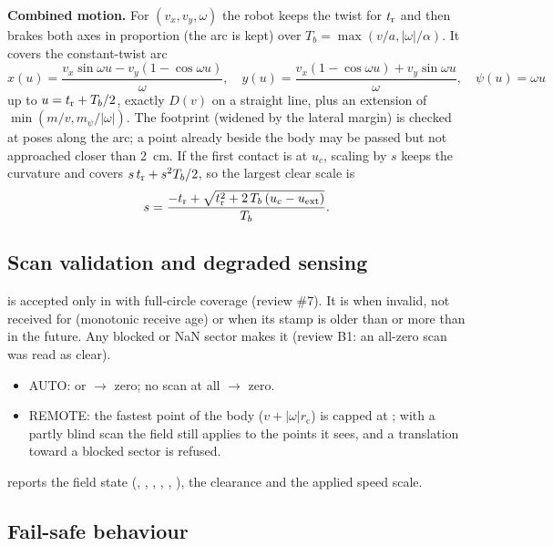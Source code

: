 \textbf{Combined motion.} For $(v_x, v_y, \omega)$ the robot keeps the twist for $t_{\mathrm{r}}$ and then
brakes both axes in proportion (the arc is kept) over $T_b = \max(v/a, |\omega|/\alpha)$. It covers
the constant-twist arc
\begin{equation}
  x(u) = \frac{v_x\sin\omega u - v_y(1 - \cos\omega u)}{\omega}, \quad
  y(u) = \frac{v_x(1 - \cos\omega u) + v_y\sin\omega u}{\omega}, \quad \psi(u) = \omega u
\end{equation}
up to $u = t_{\mathrm{r}} + T_b/2$, exactly $D(v)$ on a straight line, plus an extension of
$\min(m/v, m_\psi/|\omega|)$. The footprint (widened by the lateral margin) is checked at poses
along the arc; a point already beside the body may be passed but not approached closer than
2~cm. If the first contact is at $u_c$, scaling by $s$ keeps the curvature and covers
$s\,t_{\mathrm{r}} + s^2 T_b/2$, so the largest clear scale is
\begin{equation}
  s = \frac{-t_{\mathrm{r}} + \sqrt{t_{\mathrm{r}}^2 + 2\,T_b\,(u_c - u_{\mathrm{ext}})}}{T_b}.
\end{equation}

\subsection{Scan validation and degraded sensing}

 is accepted only in  with full-circle
coverage (review \#7). It is  when invalid, not received for
 (monotonic receive age) or when its stamp is older than
 or more than  in the future.
Any blocked or NaN sector makes it  (review B1: an all-zero scan was read as clear).
\begin{itemize}
  \item AUTO:  or  $\to$ zero; no scan at all $\to$ zero.
  \item REMOTE: the fastest point of the body ($v + |\omega| r_{\mathrm{c}}$) is capped at
    ; with a partly blind scan the field still applies to the
    points it sees, and a translation toward a blocked sector is refused.
\end{itemize}
 reports the field state (, , ,
, , ), the clearance and the applied speed scale.

\subsection{Fail-safe behaviour}

